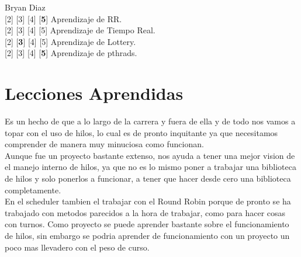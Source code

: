 \documentclass{article}
\begin{document}
Bryan Diaz \\
[1] [2] [3] [4] [\textbf{5}] Aprendizaje de RR.\\
[1] [2] [3] [4] [5] Aprendizaje de Tiempo Real.\\
[1] [2] [\textbf{3}] [4] [5] Aprendizaje de Lottery.\\
[1] [2] [3] [4] [\textbf{5}] Aprendizaje de pthrads.\\


\newpage
\section{Lecciones Aprendidas}
Es un hecho de que a lo largo de la carrera y fuera de ella y de todo nos vamos a topar con el uso de hilos, lo cual es de pronto inquitante ya que necesitamos comprender de manera muy minuciosa como funcionan.\\
Aunque fue un proyecto bastante extenso, nos ayuda a tener una mejor vision de el manejo interno de hilos, ya que no es lo mismo poner a trabajar una biblioteca de hilos y solo ponerlos a funcionar, a tener que hacer desde cero una biblioteca completamente. \\
En el scheduler tambien el trabajar con el Round Robin porque de pronto se ha trabajado con metodos parecidos a la hora de trabajar, como para hacer cosas con turnos.
Como proyecto se puede aprender bastante sobre el funcionamiento de hilos, sin embargo se podria aprender de funcionamiento con un proyecto un poco mas llevadero con el peso de curso. 




\newpage
\end{document}
